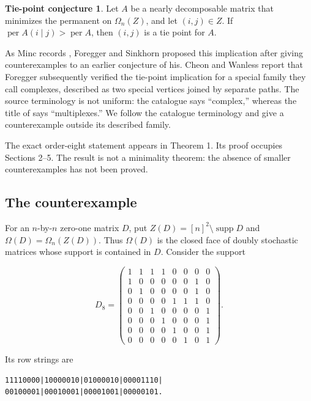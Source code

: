 \documentclass[11pt]{article}
\theoremstyle{definition}
\newtheorem*{conjecture}{Tie-point conjecture}
\begin{document}
\begin{conjecture}
Let \(A\) be a nearly decomposable matrix that minimizes the permanent on
\(\Omega_n(Z)\), and let \((i,j)\in Z\). If
\(\operatorname{per}A(i\mid j)>\operatorname{per}A\), then \((i,j)\) is a tie
point for \(A\).
\end{conjecture}

As Minc records \cite[p.~135]{minc1987}, Foregger and Sinkhorn
\cite{foreggersinkhorn1986} proposed this
implication after giving counterexamples to an earlier conjecture of his.
Cheon and Wanless \cite[p.~333]{cheonwanless2005} report that Foregger
\cite{foregger1987} subsequently verified the tie-point implication for a
special family they call complexes, described as two special vertices joined
by separate paths. The source terminology is not uniform: the catalogue says
``complex,'' whereas the title of \cite{foregger1987} says ``multiplexes.'' We
follow the catalogue terminology and give a counterexample outside its
described family.

The exact order-eight statement appears in Theorem 1. Its proof occupies
Sections 2--5. The result is not a minimality theorem: the absence of smaller
counterexamples has not been proved.

\subsection{The counterexample}

For an \(n\)-by-\(n\) zero-one matrix \(D\), put
\(Z(D)=[n]^2\setminus\operatorname{supp}D\) and
\(\Omega(D)=\Omega_n(Z(D))\). Thus \(\Omega(D)\) is the closed face of doubly
stochastic matrices whose support is contained in \(D\). Consider the support

\[
D_8=\begin{pmatrix}
1&1&1&1&0&0&0&0\\
1&0&0&0&0&0&1&0\\
0&1&0&0&0&0&1&0\\
0&0&0&0&1&1&1&0\\
0&0&1&0&0&0&0&1\\
0&0&0&1&0&0&0&1\\
0&0&0&0&1&0&0&1\\
0&0&0&0&0&1&0&1
\end{pmatrix}.
\]

Its row strings are

\begin{verbatim}
11110000|10000010|01000010|00001110|
00100001|00010001|00001001|00000101.
\end{verbatim}
\end{document}
